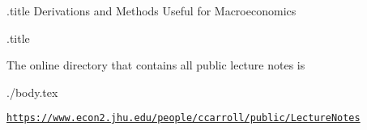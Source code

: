 \documentclass{handout}
\newcommand{\entrylabel}[1]{\mbox{\small \texttt{#1}:}\hfil}
\newenvironment{entry}
  {\begin{list}{}
      {\renewcommand{\makelabel}{\entrylabel}
       \setlength{\labelwidth}{1.5in}
       \setlength{\labelsep}{0.1in}
       \setlength{\leftmargin}{\labelwidth}
}}
{\end{list}}
\begin{document}
\large

\handoutHeader

\begin{verbatimwrite}{\jobname.title}
Derivations and Methods Useful for Macroeconomics
\end{verbatimwrite}

\centerline{\LARGE  \jobname.title}

\medskip\medskip

The online directory that contains all public lecture notes is 
\newcommand{\publec}{https://www.econ2.jhu.edu/people/ccarroll/public/LectureNotes}
\newcommand{\toDir}{\publec/MathFacts}

\begin{verbatimwrite}{./body.tex}

\centerline{\href{\publec}{\texttt{\publec}}}

\newcommand{\dir}{/Volumes/Data/Courses/Choice/LectureNotes/MathFacts/Handouts}




\newcommand{\hBoth}[1]{\href{\toDir/#1.pdf}{[pdf]}\href{\toDir/#1}{[html]}}
\begin{entry}



\end{entry}


\end{verbatimwrite}


\end{document}
